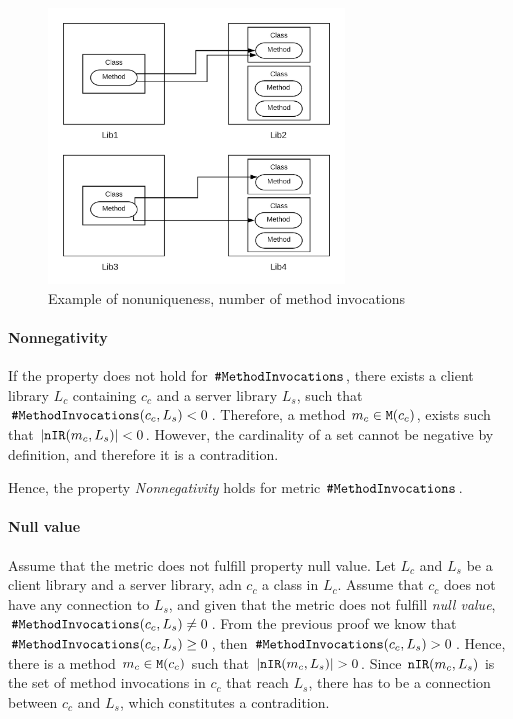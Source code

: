 \begin{figure}[ht]
\begin{center}
\includegraphics[width=0.7\textwidth]{figures/Example-Distribution-2.png}
\caption{Example of nonuniqueness, number of method invocations}
\label{fig:example-nonuniqueness-method-invocation}
\end{center}
\end{figure}

\paragraph{Nonnegativity}
If the property does not hold for $\verb|#MethodInvocations|$, there exists a client library $L_c$ containing $c_c$ and a server library $L_s$, such that $\verb|#MethodInvocations|(c_c, L_s)
< 0$. Therefore, a method $m_c \in \verb|M|(c_c)$, exists such that $|\verb|nIR|(m_c, L_s)| < 0$. However, the cardinality of a set cannot be negative by definition, and therefore it is a contradition.

Hence, the property \textit{Nonnegativity} holds for metric $\verb|#MethodInvocations|$.

\paragraph{Null value}
Assume that the metric does not fulfill property null value. Let $L_c$ and $L_s$ be a client library and a server library, adn $c_c$ a class in $L_c$. Assume that $c_c$ does not have any connection to $L_s$, and given that the metric does not fulfill \textit{null value}, $\verb|#MethodInvocations|(c_c, L_s) \neq 0$. From the previous proof we know that $\verb|#MethodInvocations|(c_c, L_s) \geq 0$, then  $\verb|#MethodInvocations|(c_c, L_s) > 0$.
Hence, there is a method $m_c \in \verb|M|(c_c)$ such that $|\verb|nIR|(m_c, L_s)| > 0$. Since $\verb|nIR|(m_c, L_s)$ is the set of method invocations in $c_c$ that reach $L_s$, there has to be a connection between $c_c$ and $L_s$, which constitutes a contradition.

